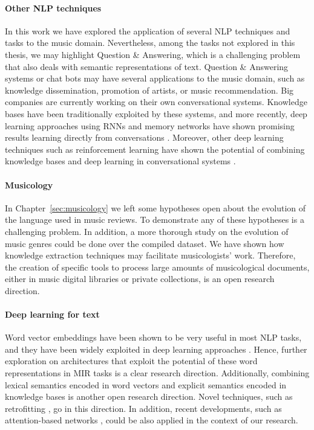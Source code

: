 \paragraph{Other NLP techniques} In this work we have explored the application of several NLP techniques and tasks to the music domain. Nevertheless, among the tasks not explored in this thesis, we may highlight Question \& Answering, which is a challenging problem that also deals with semantic representations of text. Question \& Answering systems or chat bots may have several applications to the music domain, such as knowledge dissemination, promotion of artists, or music recommendation. Big companies are currently working on their own conversational systems. Knowledge bases have been traditionally exploited by these systems, and more recently, deep learning approaches using RNNs and memory networks have shown promising results learning directly from conversations \citep{sukhbaatar2015end}. Moreover, other deep learning techniques such as reinforcement learning have shown the potential of combining knowledge bases and deep learning in conversational systems \citep{andreas2016learning}.

\paragraph{Musicology}
In Chapter~\ref{sec:musicology} we left some hypotheses open about the evolution of the language used in music reviews. To demonstrate any of these hypotheses is a challenging problem. In addition, a more thorough study on the evolution of music genres could be done over the compiled dataset. We have shown how knowledge extraction techniques may facilitate musicologists' work. Therefore, the creation of specific tools to process large amounts of musicological documents, either in music digital libraries or private collections, is an open research direction.

\paragraph{Deep learning for text} Word vector embeddings have been shown to be very useful in most NLP tasks, and they have been widely exploited in deep learning approaches \citep{Collobert2011}. Hence, further exploration on architectures that exploit the potential of these word representations in MIR tasks is a clear research direction. Additionally, combining lexical semantics encoded in word vectors and explicit semantics encoded in knowledge bases is another open research direction. Novel techniques, such as retrofitting \citep{faruqui2014retrofitting}, go in this direction. In addition, recent developments, such as attention-based networks \citep{lin2017structured}, could be also applied in the context of our research.

